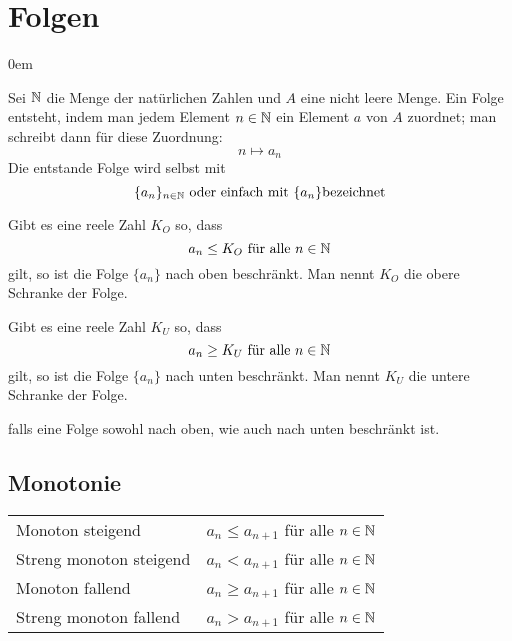 \section{Folgen}
\begin{description}\itemsep0em
	\item [Folge] Sei $\mathbb{N}$ die Menge der natürlichen Zahlen und $A$ eine nicht leere Menge.
	Ein Folge entsteht, indem man jedem Element $n \in \mathbb{N}$ ein Element $a$ von $A$ zuordnet; man schreibt
	dann für diese Zuordnung:
	\begin{equation*}
		n \mapsto a_n
	\end{equation*}
	Die entstande Folge wird selbst mit
	\begin{equation*}
		\{a_n\}_{n \in \mathbb{N}} \mbox{ oder einfach mit } \{a_n\} \mbox {bezeichnet}
	\end{equation*}

	\item[Obere Schranke] Gibt es eine reele Zahl $K_O$ so, dass
	\begin{equation*}
		a_n \leq K_O \mbox{ für alle } n \in \mathbb{N}
	\end{equation*}
	gilt, so ist die Folge $\{a_n\}$ nach oben beschränkt. Man nennt $K_O$ die obere Schranke der Folge.

	\item[Untere Schranke] Gibt es eine reele Zahl $K_U$ so, dass
	\begin{equation*}
		a_n \geq K_U \mbox{ für alle } n \in \mathbb{N}
	\end{equation*}
	gilt, so ist die Folge $\{a_n\}$ nach unten beschränkt. Man nennt $K_U$ die untere Schranke der Folge.

	\item[Beschränkt] falls eine Folge sowohl nach oben, wie auch nach unten beschränkt ist.
\end{description}

\subsection{Monotonie}
\settowidth{\MyLenA}{Streng monoton wachsend~~}
\begin{tabular}{@{}p{\the\MyLenA}%
				@{}p{\linewidth - \the\MyLenA}}
Monoton steigend & $a_n \leq a_{n + 1}$ für alle $n \in \mathbb{N}$ \\
Streng monoton steigend & $a_n < a_{n + 1}$ für alle $n \in \mathbb{N}$\\
Monoton fallend & $a_n \geq a_{n + 1}$ für alle $n \in \mathbb{N}$ \\
Streng monoton fallend & $a_n > a_{n + 1}$ für alle $n \in \mathbb{N}$\\
\end{tabular}

